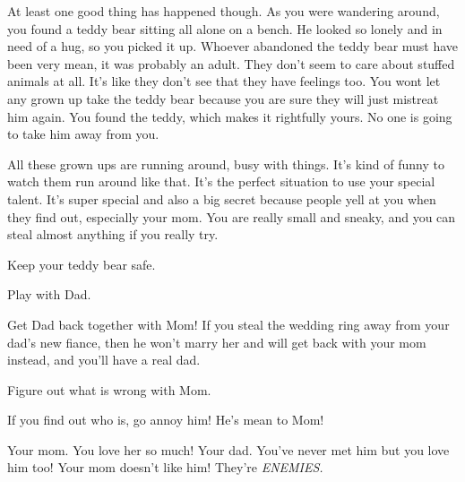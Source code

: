 \documentclass[char]{guildcamp1}
\begin{document}
At least one good thing has happened though. As you were wandering around, you found a teddy bear sitting all alone on a bench.  He looked so lonely and in need of a hug, so you picked it up. Whoever abandoned the teddy bear must have been very mean, it was probably an adult. They don't seem to care about stuffed animals at all. It's like they don't see that they have feelings too. You wont let any grown up take the teddy bear because you are sure they will just mistreat him again. You found the teddy, which makes it rightfully yours. No one is going to take him away from you.

All these grown ups are running around, busy with things. It's kind of funny to watch them run around like that. It's the perfect situation to use your special talent. It's super special and also a big secret because people yell at you when they find out, especially your mom. You are really small and sneaky, and you can steal almost anything if you really try. 






\begin{itemz}[Goals]
  \item Keep your teddy bear safe.
  \item Play with Dad.
  \item Get Dad back together with Mom! If you steal the wedding ring away from your dad's new fiance, then he won't marry her and will get back with your mom instead, and you'll have a real dad.
  \item Figure out what is wrong with Mom.
  \item If you find out who \cRival{} is, go annoy him! He's mean to Mom!
\end{itemz}


\begin{contacts}
  \contact{\cScientist{}} Your mom. You love her so much! 
  \contact{\cGroomA{}} Your dad. You've never met him but you love him too!
  \contact{\cRival{}} Your mom doesn't like him! They're \emph{ENEMIES.}
\end{contacts}
\end{document}
